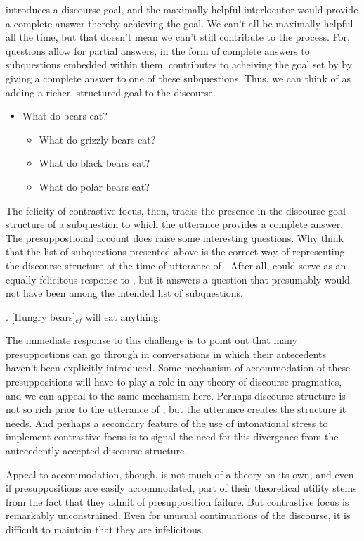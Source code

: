 \documentclass[letterpaper,10pt]{article}
\begin{document}
\Last[a] introduces a discourse goal, and the maximally helpful interlocutor would provide a complete answer thereby achieving the goal.  We can't all be maximally helpful all the time, but that doesn't mean we can't still contribute to the process.  For, questions allow for partial answers, in the form of complete answers to subquestions embedded within them.  \Last[b] contributes to acheiving the goal set by \Last[a] by giving a complete answer to one of these subquestions.  Thus, we can think of \Last[a] as adding a richer, structured goal to the discourse.

\begin{itemize}[label={}]
  \item What do bears eat?
  \begin{itemize}[label={$\drsh$}]
    \item What do grizzly bears eat?
    \item What do black bears eat?
    \item What do polar bears eat?
  \end{itemize}
\end{itemize}

The felicity of contrastive focus, then, tracks the presence in the discourse goal structure of a subquestion to which the utterance provides a complete answer.  The presuppostional account does raise some interesting questions.  Why think that the list of subquestions presented above is the correct way of representing the discourse structure at the time of utterance of \Last[b].  After all, \Next could serve as an equally felicitous response to \Last[a], but it answers a question that presumably would not have been among the intended list of subquestions.

\ex. [Hungry bears]$_{cf}$ will eat anything.

The immediate response to this challenge is to point out that many presuppostions can go through in conversations in which their antecedents haven't been explicitly introduced.  Some mechanism of accommodation of these presuppositions will have to play a role in any theory of discourse pragmatics, and we can appeal to the same mechanism here.  Perhaps discourse structure is not so rich prior to the utterance of \Last[b], but the utterance creates the structure it needs.  And perhaps a secondary feature of the use of intonational stress to implement contrastive focus is to signal the need for this divergence from the antecedently accepted discourse structure.

Appeal to accommodation, though, is not much of a theory on its own, and even if presuppositions are easily accommodated, part of their theoretical utility stems from the fact that they admit of presupposition failure.  But contrastive focus is remarkably unconstrained.  Even for unusual continuations of the discourse, it is difficult to maintain that they are infelicitous.
\end{document}
